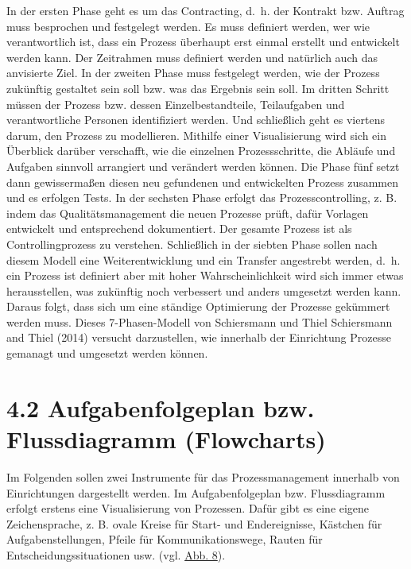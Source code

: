 \documentclass[
  letterpaper,
]{book}
\begin{document}
In der ersten Phase geht es um das Contracting, d.~h. der Kontrakt bzw.
Auftrag muss besprochen und festgelegt werden. Es muss definiert werden,
wer wie verantwortlich ist, dass ein Prozess überhaupt erst einmal
erstellt und entwickelt werden kann. Der Zeitrahmen muss definiert
werden und natürlich auch das anvisierte Ziel. In der zweiten Phase muss
festgelegt werden, wie der Prozess zukünftig gestaltet sein soll bzw.
was das Ergebnis sein soll. Im dritten Schritt müssen der Prozess bzw.
dessen Einzelbestandteile, Teilaufgaben und verantwortliche Personen
identifiziert werden. Und schließlich geht es viertens darum, den
Prozess zu modellieren. Mithilfe einer Visualisierung wird sich ein
Überblick darüber verschafft, wie die einzelnen Prozessschritte, die
Abläufe und Aufgaben sinnvoll arrangiert und verändert werden können.
Die Phase fünf setzt dann gewissermaßen diesen neu gefundenen und
entwickelten Prozess zusammen und es erfolgen Tests. In der sechsten
Phase erfolgt das Prozesscontrolling, z. B. indem das
Qualitätsmanagement die neuen Prozesse prüft, dafür Vorlagen entwickelt
und entsprechend dokumentiert. Der gesamte Prozess ist als
Controllingprozess zu verstehen. Schließlich in der siebten Phase sollen
nach diesem Modell eine Weiterentwicklung und ein Transfer angestrebt
werden, d.~h. ein Prozess ist definiert aber mit hoher
Wahrscheinlichkeit wird sich immer etwas herausstellen, was zukünftig
noch verbessert und anders umgesetzt werden kann. Daraus folgt, dass
sich um eine ständige Optimierung der Prozesse gekümmert werden muss.
Dieses 7-Phasen-Modell von Schiersmann und Thiel Schiersmann and Thiel
(2014) versucht darzustellen, wie innerhalb der Einrichtung Prozesse
gemanagt und umgesetzt werden können.

\section{4.2 Aufgabenfolgeplan bzw. Flussdiagramm
(Flowcharts)}\label{aufgabenfolgeplan-bzw-flussdiagramm-flowcharts}

Im Folgenden sollen zwei Instrumente für das Prozessmanagement innerhalb
von Einrichtungen dargestellt werden. Im Aufgabenfolgeplan bzw.
Flussdiagramm erfolgt erstens eine Visualisierung von Prozessen. Dafür
gibt es eine eigene Zeichensprache, z. B. ovale Kreise für Start- und
Endereignisse, Kästchen für Aufgabenstellungen, Pfeile für
Kommunikationswege, Rauten für Entscheidungssituationen usw. (vgl.
\hyperref[figure38]{Abb. 8}).
\end{document}
